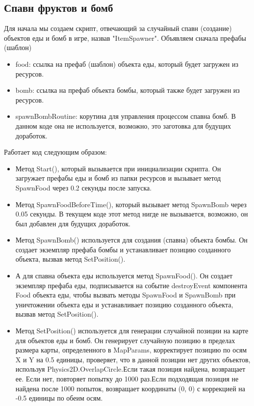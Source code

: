\subsection{Спавн фруктов и бомб}
Для начала мы создаем скрипт, отвечающий за случайный спавн (создание) объектов еды и бомб в игре, назвав "ItemSpawner". Объявляем сначала префабы (шаблон)
\begin{itemize}
    \item food: ссылка на префаб (шаблон) объекта еды, который будет загружен из ресурсов.
    \item bomb: ссылка на префаб объекта бомбы, который также будет загружен из ресурсов.
    \item spawnBombRoutine: корутина для управления процессом спавна бомб. В данном коде она не используется, возможно, это заготовка для будущих доработок.
\end{itemize}
Работает код следующим образом:
\begin{itemize}
    \item  Метод Start(), который вызывается при инициализации скрипта. Он загружает префабы еды и бомб из папки ресурсов и вызывает метод SpawnFood через 0.2 секунды после запуска.
    \item Метод SpawnFoodBeforeTime(), который вызывает метод SpawnBomb через 0.05 секунды. В текущем коде этот метод нигде не вызывается, возможно, он был добавлен для будущих доработок.
    \item Метод SpawnBomb() используется для создания (спавна) объекта бомбы. Он создает экземпляр префаба бомбы и устанавливает позицию созданного объекта, вызвав метод SetPosition().
    \item А для спавна объекта еды используется метод SpawnFood(). Он создает экземпляр префаба еды, подписывается на событие destroyEvent компонента Food объекта еды, чтобы вызвать методы SpawnFood и SpawnBomb при уничтожении объекта еды и устанавливает позицию созданного объекта, вызвав метод SetPosition().
    \item Метод SetPosition() используется для генерации случайной позиции на карте для объектов еды и бомб. Он генерирует случайную позицию в пределах размера карты, определенного в MapParams, корректирует позицию по осям X и Y на 0.5 единицы, проверяет, что в данной позиции нет других объектов, используя Physics2D.OverlapCircle.Если такая позиция найдена, возвращает ее. Если нет, повторяет попытку до 1000 раз.Если подходящая позиция не найдена после 1000 попыток, возвращает координаты (0, 0) с коррекцией на -0.5 единицы по обеим осям.
\end{itemize}
